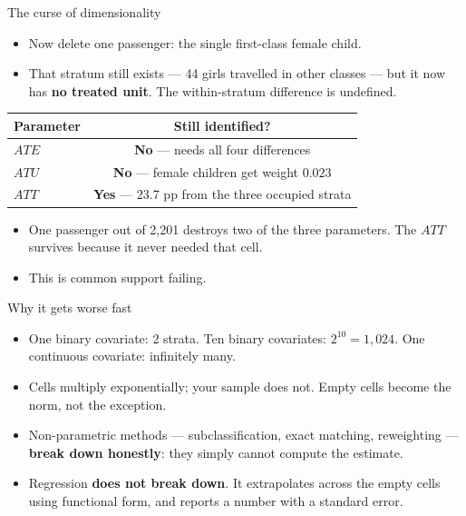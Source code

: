 \documentclass[
  11pt,
  ignorenonframetext,
  aspectratio=169,
]{beamer}
\providecommand{\tightlist}{%
  \setlength{\itemsep}{0pt}\setlength{\parskip}{0pt}}
\begin{document}
\begin{frame}{The curse of dimensionality}
\protect{}\label{the-curse-of-dimensionality}
\begin{itemize}
\tightlist
\item
  Now delete one passenger: the single first-class female child.
\item
  That stratum still exists --- 44 girls travelled in other classes ---
  but it now has \textbf{no treated unit}. The within-stratum difference
  is undefined.
\end{itemize}

\begin{center}
\begin{tabular}{lc}
\toprule
Parameter & Still identified? \\
\midrule
$ATE$ & \textbf{No} --- needs all four differences \\
$ATU$ & \textbf{No} --- female children get weight $0.023$ \\
$ATT$ & \textbf{Yes} --- $23.7$ pp from the three occupied strata \\
\bottomrule
\end{tabular}
\end{center}

\vspace{0.4em}

\begin{itemize}
\tightlist
\item
  One passenger out of 2,201 destroys two of the three parameters. The
  \(ATT\) survives because it never needed that cell.
\item
  This is common support failing.
\end{itemize}
\end{frame}

\begin{frame}{Why it gets worse fast}
\protect{}\label{why-it-gets-worse-fast}
\begin{itemize}
\tightlist
\item
  One binary covariate: 2 strata. Ten binary covariates:
  \(2^{10} = 1{,}024\). One continuous covariate: infinitely many.
\item
  Cells multiply exponentially; your sample does not. Empty cells become
  the norm, not the exception.
\item
  Non-parametric methods --- subclassification, exact matching,
  reweighting --- \textbf{break down honestly}: they simply cannot
  compute the estimate.
\item
  Regression \textbf{does not break down}. It extrapolates across the
  empty cells using functional form, and reports a number with a
  standard error.
\end{itemize}
\end{frame}
\end{document}

